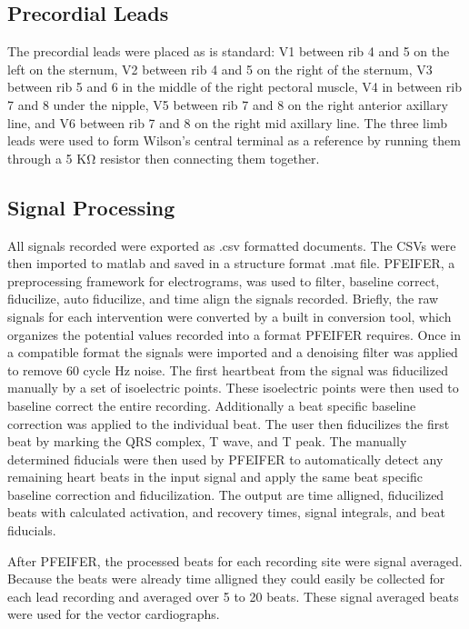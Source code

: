 \documentclass[12pt]{article}
\begin{document}
\subsection{Precordial Leads}
\par{}
The precordial leads were placed as is standard: V1 between rib 4 and 5 on the left on the sternum, V2 between rib 4 and 5 on the right of the sternum, V3 between rib 5 and 6 in the middle of the right pectoral muscle, V4 in between rib 7 and 8 under the nipple, V5 between rib 7 and 8 on the right anterior axillary line, and V6 between rib 7 and 8 on the right mid axillary line. The three limb leads were used to form Wilson's central terminal as a reference by running them through a 5 K\si{\ohm} resistor then connecting them together.

\subsection{Signal Processing}
\par{}
All signals recorded were exported as .csv formatted documents. The CSVs were then imported to matlab and saved in a structure format .mat file. PFEIFER, a preprocessing framework for electrograms, was used to filter, baseline correct, fiducilize, auto fiducilize, and time align the signals recorded.\cite{MacLeod2018_p} Briefly, the raw signals for each intervention were converted by a built in conversion tool, which organizes the potential values recorded into a format PFEIFER requires. Once in a compatible format the signals were imported and  a denoising filter was applied to remove 60 cycle Hz noise.  The first heartbeat from the signal was fiducilized manually by a set of isoelectric points. These isoelectric points were then used to baseline correct the entire recording. Additionally a beat specific baseline correction was applied to the individual beat. The user then fiducilizes the first beat by marking the QRS complex, T wave, and T peak. The manually determined fiducials were then used by PFEIFER to automatically detect any remaining heart beats in the input signal and apply the same beat specific baseline correction and fiducilization. The output are time alligned, fiducilized beats with calculated activation, and recovery times, signal integrals, and beat fiducials.

\par{}
After PFEIFER, the processed beats for each recording site were signal averaged. Because the beats were already time alligned they could easily be collected for each lead recording and averaged over 5 to 20 beats. These signal averaged beats were used for the vector cardiographs.
\end{document}
